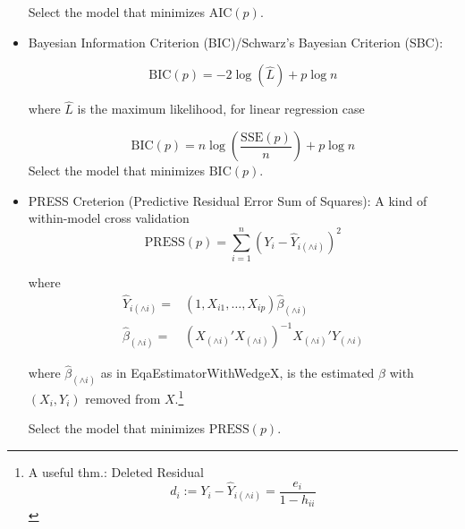 \begin{itemize}[topsep=2pt,itemsep=2pt]
        Select the model that minimizes $ \mathrm{AIC}(p) $.
        \item Bayesian Information Criterion (BIC)/Schwarz's Bayesian Criterion (SBC):
        
        \begin{equation}
            \mathrm{BIC}(p)=-2\log(\hat{L})+p\log n 
        \end{equation}
        
        where $ \hat{L} $ is the maximum likelihood, for linear regression case 
        
        \begin{equation}
            \mathrm{BIC}(p)=n\log\left(\dfrac{\mathrm{SSE}(p) }{n}\right)+p\log n
        \end{equation}
        Select the model that minimizes $ \mathrm{BIC}(p) $.
        
        \item PRESS Creterion (Predictive Residual Error Sum of Squares): A kind of within-model cross validation
        \begin{equation}
            \mathrm{PRESS}(p)=\sum_{i=1}^n(Y_i-\hat{Y}_{i(\wedge i)})^2 
        \end{equation}
        
        where 
        \begin{align*}
            \hat{Y}_{i(\wedge i)}=&(1,X_{i1},\ldots,X_{ip})\hat{\beta }_{(\wedge i)}\\
            \hat{\beta }_{(\wedge i)}=&(X_{(\wedge i)}'X_{(\wedge i)})^{-1}X_{(\wedge i)}'Y_{(\wedge i)}
        \end{align*}
        
        where $ \hat{\beta }_{(\wedge i)} $ as in {EqaEstimatorWithWedgeX}, is the estimated $ \beta  $ with $ (X_i,Y_i) $ removed from $ X $.\footnote{A useful thm.: Deleted Residual
        \begin{equation}
            d_i:=Y_i-\hat{Y}_{i(\wedge i)}=\dfrac{e_i}{1-h_{ii}} 
        \end{equation}
        
        }
            
        Select the model that minimizes $ \mathrm{PRESS}(p) $.

        
        
        
        \end{itemize}
